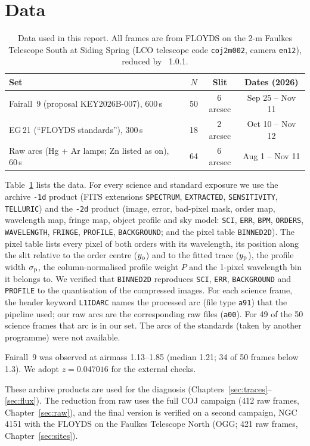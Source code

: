 \section{Data}
\label{sec:data}

\begin{table}
\centering
\caption{Data used in this report. All frames are from FLOYDS on the 2-m Faulkes Telescope South at Siding Spring
(LCO telescope code \texttt{coj2m002}, camera \texttt{en12}), reduced by \banzai{}~1.0.1.}
\label{tab:data}
\begin{tabular}{lccc}
\toprule
Set & $N$ & Slit & Dates (2026) \\
\midrule
Fairall~9 (proposal KEY2026B-007), 600\,s & 50 & 6\,arcsec & Sep 25 -- Nov 11 \\
EG\,21 (``FLOYDS standards''), 300\,s & 18 & 2\,arcsec & Oct 10 -- Nov 12 \\
Raw arcs (Hg + Ar lamps; Zn listed as on), 60\,s & 64 & 6\,arcsec & Aug 1 -- Nov 11 \\
\bottomrule
\end{tabular}
\end{table}

Table~\ref{tab:data} lists the data. For every science and standard exposure we use the archive \texttt{-1d}
product (FITS extensions \texttt{SPECTRUM}, \texttt{EXTRACTED}, \texttt{SENSITIVITY}, \texttt{TELLURIC}) and the
\texttt{-2d} product (image, error, bad-pixel mask, order map, wavelength map, fringe map, object profile and sky
model: \texttt{SCI}, \texttt{ERR}, \texttt{BPM}, \texttt{ORDERS}, \texttt{WAVELENGTH}, \texttt{FRINGE},
\texttt{PROFILE}, \texttt{BACKGROUND}; and the pixel table \texttt{BINNED2D}). The pixel table lists
every pixel of both orders with its wavelength, its position along the slit relative to the order centre
($y_{\rm o}$) and to the fitted trace ($y_{\rm p}$), the profile width $\sigma_{\rm p}$, the column-normalised
profile weight $P$ and the 1-pixel wavelength bin it belongs to. We verified that \texttt{BINNED2D} reproduces
\texttt{SCI}, \texttt{ERR}, \texttt{BACKGROUND} and \texttt{PROFILE} to the quantisation of the compressed images.
For each science frame, the header keyword \texttt{L1IDARC} names the processed arc (file type \texttt{a91}) that the
pipeline used; our raw arcs are the corresponding raw files (\texttt{a00}). For 49 of the 50 science frames that arc
is in our set. The arcs of the standards (taken by another
programme) were not available.

Fairall~9 was observed at airmass 1.13--1.85 (median 1.21; 34 of 50 frames below 1.3). We adopt
$z=0.047016$ for the external checks.

These archive products are used for the diagnosis (Chapters~\ref{sec:traces}--\ref{sec:flux}). The reduction from
raw uses the full COJ campaign (412 raw frames, Chapter~\ref{sec:raw}), and the final version is verified on a second
campaign, NGC\,4151 with the FLOYDS on the Faulkes Telescope North (OGG; 421 raw frames, Chapter~\ref{sec:sites}).
